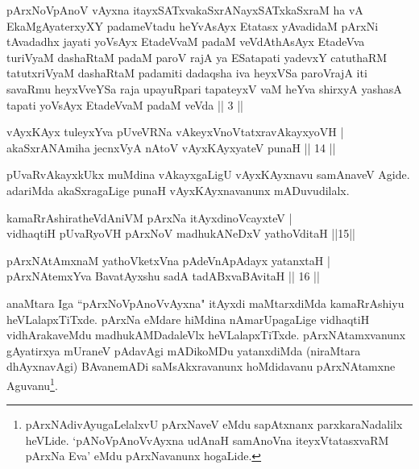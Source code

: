 \begin{kandikeshl}
pArxNoV\s pAnoV vAyxna itayxSATxvakaSxrANayxSATxkaSxraM ha vA EkaM\break gAyaterxyXY padameVtadu heYvAsAyx Etatasx yAvadidaM pArxNi tAvadadhx jayati yoV\s sAyx EtadeVvaM padaM veVdAthAsAyx EtadeVva turiVyaM dashaRtaM padaM paroV rajA ya ESatapati yadevxY catuthaRM tatutxriVyaM dashaRtaM padamiti dadaqsha iva heyxVSa paroVrajA iti savaRmu heyxVveYSa raja upayuRpari tapateyxV vaM heYva shirxyA yashasA tapati yoV\s sAyx EtadeVvaM padaM veVda || 3 ||
\end{kandikeshl}


\begin{shl}
vAyxKAyx tuleyxYva pUveVRNa vAkeyxVnoVtatxravAkayxyoVH | \\
akaSxrANAmiha jecnxVyA nAtoV vAyxKAyxyateV punaH \hfill || 14 || 
\end{shl}

\begin{artha} 
pUvaRvAkayxkUkx muMdina vAkayxgaLigU vAyxKAyxnavu samAnaveV Agide. 
adariMda akaSxragaLige punaH vAyxKAyxnavanunx mADuvudilalx.
\end{artha}

\begin{shl}
kamaRrAshiratheVdAniVM pArxNa itAyxdinoVcayxteV | \\
vidhaqtiH pUvaRyoVH pArxNoV madhukANeDxV yathoVditaH \hfill ||15|| 
\end{shl}

\begin{shl}
pArxNAtAmxnaM yathoVketxVna pAdeVnA\s \s pAdayx yatanxtaH | \\
pArxNAtemxYva BavatAyxshu sadA tadABxvaBAvitaH \hfill ||  16 || 
\end{shl}

\begin{artha} 
anaMtara Iga ``pArxNoVpAnoVvAyxna" itAyxdi maMtarxdiMda kamaRrAshiyu 
heVLalapxTiTxde. pArxNa eMdare hiMdina nAmarUpagaLige vidhaqtiH 
vidhArakaveMdu madhukAMDadaleVlx heVLalapxTiTxde. 
pArxNAtamxvanunx gAyatirxya mUraneV pAdavAgi mADikoMDu yatanxdiMda 
(niraMtara dhAyxnavAgi) BAvanemADi saMsAkxravanunx hoMdidavanu 
pArxNAtamxne Aguvanu\footnote{pArxNAdivAyugaLelalxvU pArxNaveV eMdu 
sapAtxnanx parxkaraNadalilx heVLide. `pANoV\s pAnoVvAyxna udAnaH samAnoV\s na iteyxVtatasxvaRM pArxNa Eva' eMdu pArxNavanunx hogaLide.}.
\end{artha}

